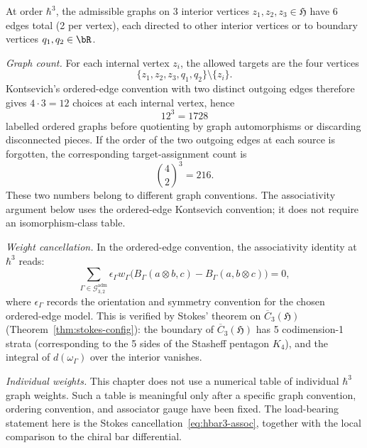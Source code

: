 \begin{computation}
\label{comp:kontsevich-3vertex}

At order $\hbar^3$, the admissible graphs on 3 interior vertices
$z_1, z_2, z_3 \in \mathfrak{H}$ have 6 edges total (2 per vertex),
each directed to other interior vertices or to boundary vertices
$q_1, q_2 \in \bR$.

\emph{Graph count.}
For each internal vertex \(z_i\), the allowed targets are the four
vertices
\[
\{z_1,z_2,z_3,q_1,q_2\}\setminus\{z_i\}.
\]
Kontsevich's ordered-edge convention with two distinct outgoing edges
therefore gives \(4\cdot 3=12\) choices at each internal vertex, hence
\[
12^3=1728
\]
labelled ordered graphs before quotienting by graph automorphisms or
discarding disconnected pieces. If the order of the two outgoing edges
at each source is forgotten, the corresponding target-assignment count
is
\[
\binom42^3=216.
\]
These two numbers belong to different graph conventions. The
associativity argument below uses the ordered-edge Kontsevich
convention; it does not require an isomorphism-class table.

\emph{Weight cancellation.}
In the ordered-edge convention, the associativity identity at
$\hbar^3$ reads:
\begin{equation}\label{eq:hbar3-assoc}
\sum_{\Gamma\in\mathcal G_{3,2}^{\mathrm{adm}}}
\epsilon_\Gamma w_\Gamma
\bigl(B_{\Gamma}(a \otimes b, c)
- B_{\Gamma}(a, b \otimes c)\bigr) = 0,
\end{equation}
where \(\epsilon_\Gamma\) records the orientation and symmetry
convention for the chosen ordered-edge model.
This is verified by Stokes' theorem on $\overline{C}_3(\mathfrak{H})$
(Theorem~\ref{thm:stokes-config}): the boundary of
$\overline{C}_3(\mathfrak{H})$ has 5 codimension-1 strata
(corresponding to the 5 sides of the Stasheff pentagon $K_4$),
and the integral of $d(\omega_\Gamma)$ over the interior vanishes.

\emph{Individual weights.}
This chapter does not use a numerical table of individual
\(\hbar^3\) graph weights. Such a table is meaningful only after a
specific graph convention, ordering convention, and associator gauge
have been fixed. The load-bearing statement here is the Stokes
cancellation~\eqref{eq:hbar3-assoc}, together with the local
comparison to the chiral bar differential.
\end{computation}

